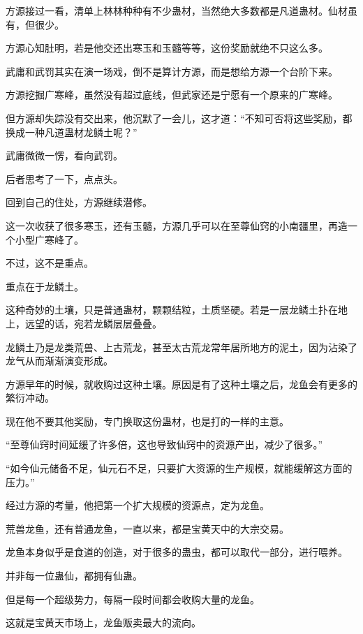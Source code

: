 
\begin{this_body}

方源接过一看，清单上林林种种有不少蛊材，当然绝大多数都是凡道蛊材。仙材虽有，但很少。

方源心知肚明，若是他交还出寒玉和玉髓等等，这份奖励就绝不只这么多。

武庸和武罚其实在演一场戏，倒不是算计方源，而是想给方源一个台阶下来。

方源挖掘广寒峰，虽然没有超过底线，但武家还是宁愿有一个原来的广寒峰。

但方源却失踪没有交出来，他沉默了一会儿，这才道：“不知可否将这些奖励，都换成一种凡道蛊材龙鳞土呢？”

武庸微微一愣，看向武罚。

后者思考了一下，点点头。

回到自己的住处，方源继续潜修。

这一次收获了很多寒玉，还有玉髓，方源几乎可以在至尊仙窍的小南疆里，再造一个小型广寒峰了。

不过，这不是重点。

重点在于龙鳞土。

这种奇妙的土壤，只是普通蛊材，颗颗结粒，土质坚硬。若是一层龙鳞土扑在地上，远望的话，宛若龙鳞层层叠叠。

龙鳞土乃是龙类荒兽、上古荒龙，甚至太古荒龙常年居所地方的泥土，因为沾染了龙气从而渐渐演变形成。

方源早年的时候，就收购过这种土壤。原因是有了这种土壤之后，龙鱼会有更多的繁衍冲动。

现在他不要其他奖励，专门换取这份蛊材，也是打的一样的主意。

“至尊仙窍时间延缓了许多倍，这也导致仙窍中的资源产出，减少了很多。”

“如今仙元储备不足，仙元石不足，只要扩大资源的生产规模，就能缓解这方面的压力。”

经过方源的考量，他把第一个扩大规模的资源点，定为龙鱼。

荒兽龙鱼，还有普通龙鱼，一直以来，都是宝黄天中的大宗交易。

龙鱼本身似乎是食道的创造，对于很多的蛊虫，都可以取代一部分，进行喂养。

并非每一位蛊仙，都拥有仙蛊。

但是每一个超级势力，每隔一段时间都会收购大量的龙鱼。

这就是宝黄天市场上，龙鱼贩卖最大的流向。


\end{this_body}

